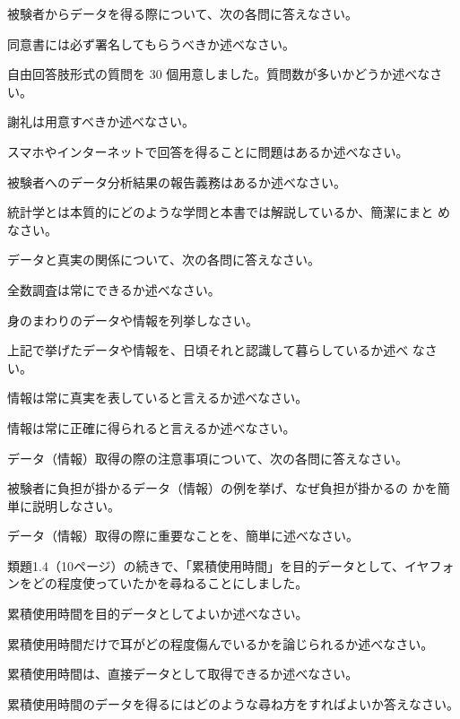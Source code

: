 \begin{exercise}
    \newpage

    \item{}
    被験者からデータを得る際について、次の各問に答えなさい。
    \begin{exenum}
        \item 同意書には必ず署名してもらうべきか述べなさい。
        \item 自由回答肢形式の質問を 30 個用意しました。質問数が多いかどうか述べなさい。
        \item 謝礼は用意すべきか述べなさい。
        \item スマホやインターネットで回答を得ることに問題はあるか述べなさい。
        \item 被験者へのデータ分析結果の報告義務はあるか述べなさい。  
    \end{exenum}
    
    \item{} 
    統計学とは本質的にどのような学問と本書では解説しているか、簡潔にまと めなさい。
    
    \item{}
    データと真実の関係について、次の各問に答えなさい。
    \begin{exenum}
        \item 全数調査は常にできるか述べなさい。
        \item 身のまわりのデータや情報を列挙しなさい。
        \item 上記で挙げたデータや情報を、日頃それと認識して暮らしているか述べ なさい。
        \item 情報は常に真実を表していると言えるか述べなさい。
        \item 情報は常に正確に得られると言えるか述べなさい。
    \end{exenum}
    
    \item{}
    データ（情報）取得の際の注意事項について、次の各問に答えなさい。
    \begin{exenum}
        \item 被験者に負担が掛かるデータ（情報）の例を挙げ、なぜ負担が掛かるの かを簡単に説明しなさい。
        \item データ（情報）取得の際に重要なことを、簡単に述べなさい。
    \end{exenum}
    
    \item{} 
    類題1.4（10ページ）の続きで、「累積使用時間」を目的データとして、イヤフ\nobreak ォンをどの程度使っていたかを尋ねることにしました。
    \begin{exenum}
        \item 累積使用時間を目的データとしてよいか述べなさい。
        \item 累積使用時間だけで耳がどの程度傷んでいるかを論じられるか述べなさい。
        \item 累積使用時間は、直接データとして取得できるか述べなさい。
        \item 累積使用時間のデータを得るにはどのような尋ね方をすればよいか答えなさい。
    \end{exenum}


\end{exercise}
